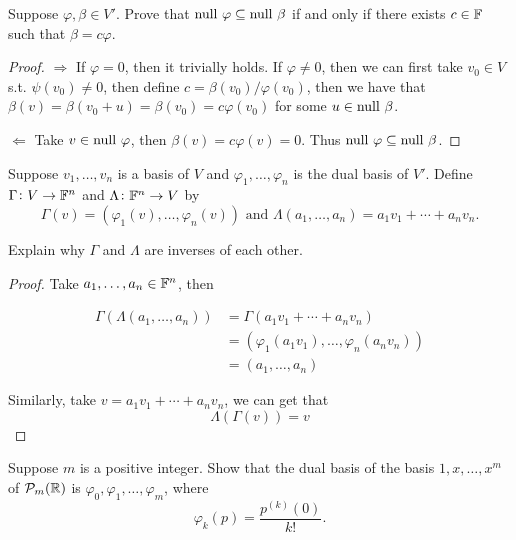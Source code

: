 \documentclass{extarticle}
\begin{document}
\begin{problem}{6}
    Suppose \(\varphi, \beta \in V'\). Prove that \(\text{null } \varphi \subseteq \text{null } \beta\) 
    if and only if there exists \(c \in \mathbb{F}\) such that \(\beta = c \varphi\). 
\end{problem}

\begin{proof}
\(\Rightarrow\) If \(\varphi = 0\), then it trivially holds. If \(\varphi \neq 0 \), then 
we can first take \(v_0 \in V\) s.t. \(\psi(v_0) \neq 0 \), then define \(c = \beta(v_0) / \varphi(v_0)\), 
then we have that \(\beta(v) = \beta(v_0 + u) = \beta(v_0) = c \varphi(v_0)\) for some \(u \in \text{null } \beta\). 

\(\Leftarrow\) Take \(v \in \text{null } \varphi\), then \(\beta(v) = c \varphi(v) = 0\). Thus 
\(\text{null } \varphi \subseteq \text{null } \beta\). 
\end{proof}


\begin{problem}{8}
    Suppose \(v_1, \ldots, v_n\) is a basis of \(V\) and \(\varphi_1, \ldots, \varphi_n\) is 
    the dual basis of \(V'\). Define \(\Gamma \colon V \to \mathbb{F}^n\) and \(\Lambda \colon 
    \mathbb{F}^n \to V\) by 
    \[\Gamma (v) = ( \varphi_1(v), \ldots, \varphi_n(v) ) \text{  and  } \Lambda(a_1, 
    \ldots, a_n) = a_1 v_1 + \cdots + a_n v_n.\]

    Explain why \(\Gamma\) and \(\Lambda\) are inverses of each other. 
\end{problem}

\begin{proof}
Take \(a_1, \ldots, a_n \in \mathbb{F}^n\), then 

\begin{align*}
    \Gamma(\Lambda(a_1, \ldots, a_n)) 
    &= \Gamma(a_1 v_1 + \cdots + a_n v_n)    \\ 
    &= (\varphi_1(a_1 v_1), \ldots, \varphi_n(a_n v_n)) \\ 
    &= (a_1, \ldots, a_n)
\end{align*}

Similarly, take \(v = a_1 v_1 + \cdots + a_n v_n\), we can get that 
\[\Lambda(\Gamma(v)) = v\]

\end{proof}

\begin{problem}{9}
    Suppose \(m\) is a positive integer. Show that the dual basis of the basis 
    \(1, x, \ldots, x^m\) of \(\mathcal{P}_m(\mathbb{R})\) is \(\varphi_0, \varphi_1, \ldots, \varphi_m\), where 
    \[\varphi_k(p) = \frac{p^{(k)}(0)}{k!}.\]
\end{problem}
\end{document}
